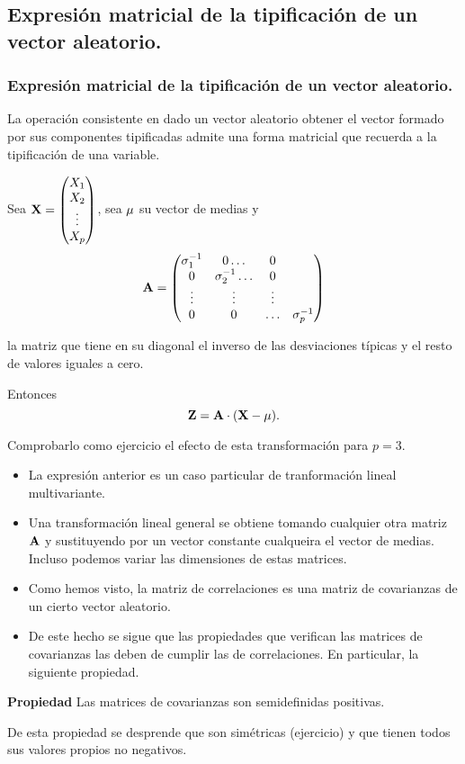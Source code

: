 \subsection{Expresión matricial de la tipificación de un vector aleatorio.}
\begin{frame}
\frametitle[Exp. mat. tip. vect.a.]{Expresión matricial de la tipificación de un vector aleatorio.}
La operación consistente en dado un vector aleatorio obtener el vector formado  por sus componentes tipificadas admite una forma matricial que recuerda a la tipificación de una variable.

Sea  $\mathbf{X}=\begin{pmatrix}X_1\\ X_2 \\\vdots \\ X_p\end{pmatrix}$, sea $\mathbf{\mu}$ su vector de medias y $$\mathbf{A}=\begin{pmatrix}\sigma_{1}^{-1} & 0 \ldots &0\\
0 & \sigma_{2}^{-1} \ldots &0\\
\vdots & \vdots &\vdots\\
0 & 0 & \ldots &\sigma_{p}^{-1}
\end{pmatrix}$$

la matriz que tiene en su diagonal el inverso de las desviaciones típicas y el resto de valores iguales a cero.
\end{frame}

Entonces 
$$\mathbf{Z}=\mathbf{A}\cdot (\mathbf{X}-\mathbf{\mu}).$$

Comprobarlo como ejercicio el efecto de esta transformación para $p=3$.

\begin{itemize}
\item 
La expresión anterior es un caso particular de tranformación lineal multivariante.
\item Una transformación lineal general se obtiene tomando cualquier otra matriz $\mathbf{A}$ y sustituyendo por  un vector constante cualqueira el vector de medias. Incluso podemos variar las dimensiones de estas matrices.
\end{itemize}




\begin{frame}
\begin{itemize}
\item Como hemos visto, la matriz de correlaciones es una matriz de covarianzas de un cierto vector aleatorio.
\item   De este hecho se sigue que las propiedades que verifican las matrices de covarianzas las deben de cumplir las de correlaciones. En particular, la siguiente propiedad.
\end{itemize}

\textbf{Propiedad}
Las matrices de covarianzas son semidefinidas positivas.

De esta propiedad se desprende que son simétricas (ejercicio) y que tienen todos sus valores propios no negativos.

\end{frame}
